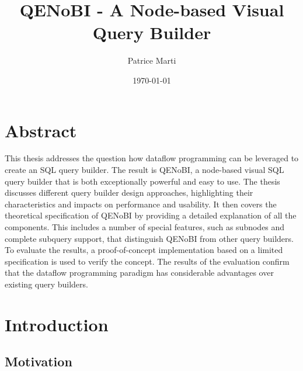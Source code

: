 \documentclass[11pt,a4paper]{globis-book}
\title{QENoBI - A Node-based Visual Query Builder}
\author{Patrice Marti}
\institute{Institute of Information Systems}
\date{\today}
\begin{document}
\frontmatter
\maketitlepage
\cleardoublepage
{}

\chapter*{Abstract}
This thesis addresses the question how dataflow programming can be leveraged to create an SQL query builder. The result is QENoBI, a node-based visual SQL query builder that is both exceptionally powerful and easy to use. The thesis discusses different query builder design approaches, highlighting their characteristics and impacts on performance and usability. It then covers the theoretical specification of QENoBI by providing a detailed explanation of all the components. This includes a number of special features, such as subnodes and complete subquery support, that distinguish QENoBI from other query builders. To evaluate the results, a proof-of-concept implementation based on a limited specification is used to verify the concept. The results of the evaluation confirm that the dataflow programming paradigm has considerable advantages over existing query builders.

\tableofcontents

\mainmatter




\chapter{Introduction}
\section{Motivation}
\end{document}

